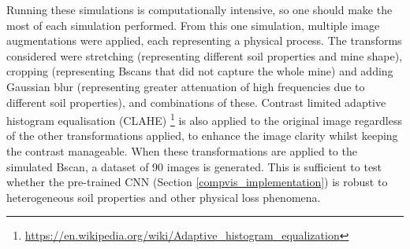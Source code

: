       Running these simulations is computationally intensive, so one should make the most of each simulation performed. From this one simulation, multiple image augmentations were applied, each representing a physical process. The transforms considered were stretching (representing different soil properties and mine shape), cropping (representing Bscans that did not capture the whole mine) and adding Gaussian blur (representing greater attenuation of high frequencies due to different soil properties), and combinations of these. Contrast limited adaptive histogram equalisation (CLAHE) \footnote{\url{https://en.wikipedia.org/wiki/Adaptive_histogram_equalization}} is also applied to the original image regardless of the other transformations applied, to enhance the image clarity whilst keeping the contrast manageable. When these transformations are applied to the simulated Bscan, a dataset of 90 images is generated. This is sufficient to test whether the pre-trained CNN (Section \ref{compvis_implementation}) is robust to heterogeneous soil properties and other physical loss phenomena.
        
